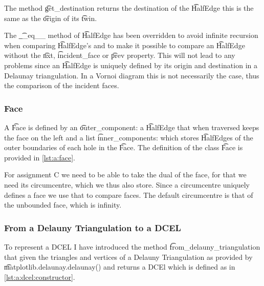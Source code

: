 	The method \t{get_destination} returns the destination of the \t{HalfEdge} this is the same as the \t{origin} of its \t{twin}.

	The \t{__eq__} method of \t{HalfEdge} has been overridden to avoid infinite recursion when comparing \t{HalfEdge}'s and to make it possible to compare an \t{HalfEdge} without the \t{nxt}, \t{incident_face} or \t{prev} property. This will not lead to any problems since an \t{HalfEdge} is uniquely defined by its origin and destination in a Delaunay triangulation. In a Vornoi diagram this is not necessarily the case, thus the comparison of the incident faces.

	

\subsubsection*{Face}
	A \t{Face} is defined by an \t{outer_component}: a \t{HalfEdge} that when traversed keeps the face on the left and a list \t{inner_components}: which stores \t{HalfEdge}s of the outer boundaries of each hole in the \t{Face}. The definition of the class \t{Face} is provided in \autoref{lst:a:face}. 

	For assignment C we need to be able to take the dual of the face, for that we need its circumcentre, which we thus also store. Since a circumcentre uniquely defines a face we use that to compare faces. The default circumcentre is that of the unbounded face, which is infinity.

	

\subsubsection*{From a Delauny Triangulation to a DCEL}
	To represent a DCEL I have introduced the method \t{from_delauny_triangulation} that given the triangles and vertices of a Delauny Triangulation as provided by \t{matplotlib.delaunay.delaunay()} and returns a DCEl which is defined as in \autoref{lst:a:dcel:constructor}. 

	

